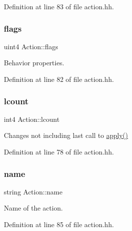 Definition at line 83 of file action.\+hh.

\mbox{\label{class_action_a94208349db3026a47e0bcf3af6f51d55}} 
\subsubsection{\texorpdfstring{flags}{flags}}
{\footnotesize\ttfamily uint4 Action\+::flags\hspace{0.3cm}{\ttfamily [protected]}}



Behavior properties. 



Definition at line 82 of file action.\+hh.

\mbox{\label{class_action_a83233dbe848a09bc1aab5e2c0942764e}} 
\subsubsection{\texorpdfstring{lcount}{lcount}}
{\footnotesize\ttfamily int4 Action\+::lcount\hspace{0.3cm}{\ttfamily [protected]}}



Changes not including last call to \mbox{\hyperlink{class_action_aac1c3999d6c685b15f5d9765a4d04173}{apply()}} 



Definition at line 78 of file action.\+hh.

\mbox{\label{class_action_ab73b13cffdb1b32679cf46b783c7e404}} 
\subsubsection{\texorpdfstring{name}{name}}
{\footnotesize\ttfamily string Action\+::name\hspace{0.3cm}{\ttfamily [protected]}}



Name of the action. 



Definition at line 85 of file action.\+hh.

\mbox{\label{class_action_a4d1765a2b054acfc480c534d955a2887}} 
